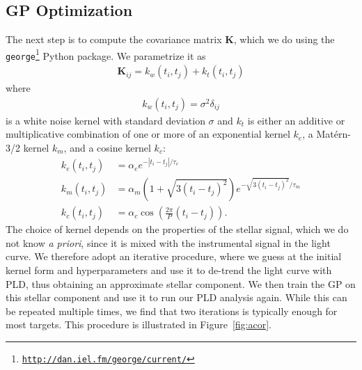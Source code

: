 \documentclass[]{emulateapj}
\begin{document}
\subsection{GP Optimization}
\label{sec:gpopt}
\begin{figure*}[t]
  \begin{center}
    \leavevmode
       \caption{GP optimization procedure for EPIC 201497682. In the top left panel we 
                plot the raw SAP flux (black) and a ten chunk, first order PLD fit
                (red); the residuals are shown in the panel below. These are used to
                compute the power spectrum of the stellar signal (top right), and
                its autocorrelation function (bottom right, black curve). Different
                kernels are then fit to the autocorrelation function, and the one
                with the lowest $\chi^2$ value is chosen for the de-trending step
                (red curve). The grey envelope about the autocorrelation curve is
                the ad hoc standard error assumed to compute $\chi^2$.
                }
     \label{fig:acor}
  \end{center}
\end{figure*}

The next step is to compute the covariance matrix $\mathbf{K}$, which we do using
the \texttt{george}\footnote{\texttt{\url{http://dan.iel.fm/george/current/}}} Python package. We parametrize 
it as
\begin{align}
\label{eq:covariance}
\mathbf{K}_{ij} = k_w(t_i, t_j) + k_t(t_i, t_j)
\end{align}
where
\begin{align}
\label{eq:whitekernel}
k_w(t_i, t_j) = \sigma^2\delta_{ij}
\end{align}
is a white noise kernel with standard deviation $\sigma$ and $k_t$ is either an 
additive or multiplicative combination
of one or more of an exponential kernel $k_e$, a Mat\'ern-3/2 kernel $k_m$, and
a cosine kernel $k_c$:
\begin{align}
\label{eq:kernels}
k_e(t_i, t_j) &= \alpha_e e^{-\left|t_i - t_j\right|/\tau_e}\nonumber\\
k_m(t_i, t_j) &= \alpha_m \left(1 + \sqrt{3(t_i - t_j)^2}\right) e^{-\sqrt{3(t_i - t_j)^2}/\tau_m}\nonumber\\ 
k_c(t_i, t_j) &= \alpha_c \cos{\left(\frac{2\pi}{P}(t_i - t_j)\right)}.
\end{align}
The choice of kernel depends on the properties of the stellar signal, which we do
not know \emph{a priori}, since it is mixed with the instrumental signal in the
light curve. We therefore adopt an iterative procedure, where we guess at the initial
kernel form and hyperparameters and use it to de-trend the light curve with PLD, thus
obtaining an approximate stellar component. We then train the GP on this stellar
component and use it to run our PLD analysis again. While this can be repeated
multiple times, we find that two iterations is typically enough for most targets. This procedure
is illustrated in Figure~\ref{fig:acor}.
\end{document}
